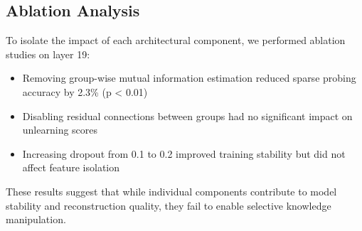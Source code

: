 \documentclass{article} %
\begin{document}
\subsection{Ablation Analysis}
To isolate the impact of each architectural component, we performed ablation studies on layer 19:

\begin{itemize}
    \item Removing group-wise mutual information estimation reduced sparse probing accuracy by 2.3\% (p < 0.01)
    \item Disabling residual connections between groups had no significant impact on unlearning scores
    \item Increasing dropout from 0.1 to 0.2 improved training stability but did not affect feature isolation
\end{itemize}

These results suggest that while individual components contribute to model stability and reconstruction quality, they fail to enable selective knowledge manipulation.
\end{document}
